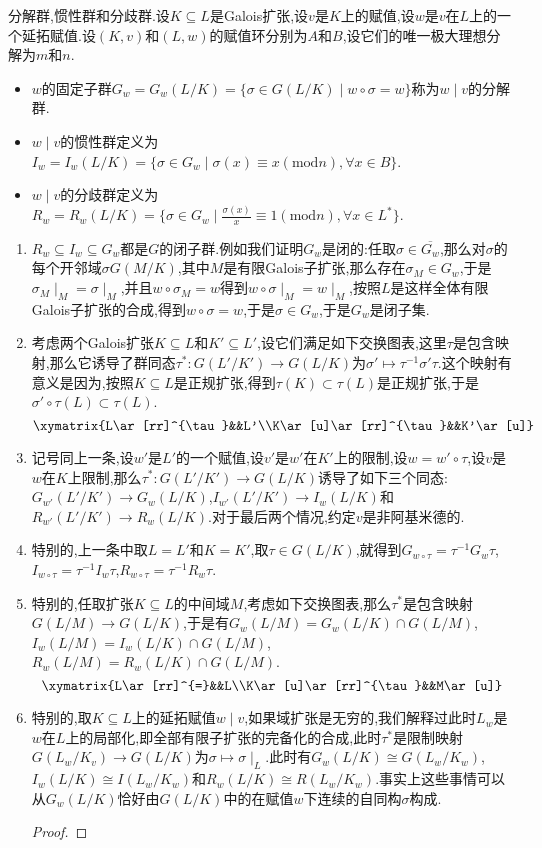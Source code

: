 分解群,惯性群和分歧群.设$K\subseteq L$是Galois扩张,设$v$是$K$上的赋值,设$w$是$v$在$L$上的一个延拓赋值.设$(K,v)$和$(L,w)$的赋值环分别为$A$和$B$,设它们的唯一极大理想分解为$m$和$n$.
\begin{itemize}
	\item $w$的固定子群$G_w=G_w(L/K)=\{\sigma\in G(L/K)\mid w\circ\sigma=w\}$称为$w\mid v$的分解群.
	\item $w\mid v$的惯性群定义为$I_w=I_w(L/K)=\{\sigma\in G_w\mid\sigma(x)\equiv x(\mathrm{mod}n),\forall x\in B\}$.
	\item $w\mid v$的分歧群定义为$R_w=R_w(L/K)=\{\sigma\in G_w\mid\frac{\sigma(x)}{x}\equiv1(\mathrm{mod}n),\forall x\in L^*\}$.
\end{itemize}
\begin{enumerate}
	\item $R_w\subseteq I_w\subseteq G_w$都是$G$的闭子群.例如我们证明$G_w$是闭的:任取$\sigma\in\overline{G_w}$,那么对$\sigma$的每个开邻域$\sigma G(M/K)$,其中$M$是有限Galois子扩张,那么存在$\sigma_M\in G_w$,于是$\sigma_M\mid_M=\sigma\mid_M$,并且$w\circ\sigma_M=w$得到$w\circ\sigma\mid_M=w\mid_M$,按照$L$是这样全体有限Galois子扩张的合成,得到$w\circ\sigma=w$,于是$\sigma\in G_w$,于是$G_w$是闭子集.
	\item 考虑两个Galois扩张$K\subseteq L$和$K'\subseteq L'$,设它们满足如下交换图表,这里$\tau$是包含映射,那么它诱导了群同态$\tau^*:G(L'/K')\to G(L/K)$为$\sigma'\mapsto\tau^{-1}\sigma'\tau$.这个映射有意义是因为,按照$K\subseteq L$是正规扩张,得到$\tau(K)\subset\tau(L)$是正规扩张,于是$\sigma'\circ\tau(L)\subset\tau(L)$.
	$$\xymatrix{L\ar[rr]^{\tau}&&L'\\K\ar[u]\ar[rr]^{\tau}&&K'\ar[u]}$$
	\item 记号同上一条,设$w'$是$L'$的一个赋值,设$v'$是$w'$在$K'$上的限制,设$w=w'\circ\tau$,设$v$是$w$在$K$上限制,那么$\tau^*:G(L'/K')\to G(L/K)$诱导了如下三个同态:$G_{w'}(L'/K')\to G_w(L/K)$,$I_{w'}(L'/K')\to I_w(L/K)$和$R_{w'}(L'/K')\to R_w(L/K)$.对于最后两个情况,约定$v$是非阿基米德的.
	\item 特别的,上一条中取$L=L'$和$K=K'$,取$\tau\in G(L/K)$,就得到$G_{w\circ\tau}=\tau^{-1}G_w\tau$,$I_{w\circ\tau}=\tau^{-1}I_w\tau$,$R_{w\circ\tau}=\tau^{-1}R_w\tau$.
	\item 特别的,任取扩张$K\subseteq L$的中间域$M$,考虑如下交换图表,那么$\tau^*$是包含映射$G(L/M)\to G(L/K)$,于是有$G_w(L/M)=G_w(L/K)\cap G(L/M)$,$I_w(L/M)=I_w(L/K)\cap G(L/M)$,$R_w(L/M)=R_w(L/K)\cap G(L/M)$.
	$$\xymatrix{L\ar[rr]^{=}&&L\\K\ar[u]\ar[rr]^{\tau}&&M\ar[u]}$$
	\item 特别的,取$K\subseteq L$上的延拓赋值$w\mid v$,如果域扩张是无穷的,我们解释过此时$L_w$是$w$在$L$上的局部化,即全部有限子扩张的完备化的合成,此时$\tau^*$是限制映射$G(L_w/K_v)\to G(L/K)$为$\sigma\mapsto\sigma\mid_L$.此时有$G_w(L/K)\cong G(L_w/K_w)$,$I_w(L/K)\cong I(L_w/K_w)$和$R_w(L/K)\cong R(L_w/K_w)$.事实上这些事情可以从$G_w(L/K)$恰好由$G(L/K)$中的在赋值$w$下连续的自同构$\sigma$构成.
	\begin{proof}
		

\end{proof}
\end{enumerate}

